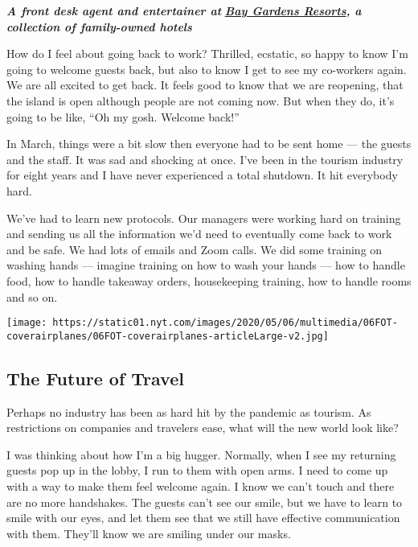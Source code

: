 \emph{\textbf{A front desk agent and entertainer at}}
\textbf{\href{https://www.baygardensresorts.com/}{\emph{Bay Gardens
Resorts}}\emph{, a collection of family-owned hotels}}

How do I feel about going back to work? Thrilled, ecstatic, so happy to
know I'm going to welcome guests back, but also to know I get to see my
co-workers again. We are all excited to get back. It feels good to know
that we are reopening, that the island is open although people are not
coming now. But when they do, it's going to be like, ``Oh my gosh.
Welcome back!''

In March, things were a bit slow then everyone had to be sent home ---
the guests and the staff. It was sad and shocking at once. I've been in
the tourism industry for eight years and I have never experienced a
total shutdown. It hit everybody hard.

We've had to learn new protocols. Our managers were working hard on
training and sending us all the information we'd need to eventually come
back to work and be safe. We had lots of emails and Zoom calls. We did
some training on washing hands --- imagine training on how to wash your
hands --- how to handle food, how to handle takeaway orders,
housekeeping training, how to handle rooms and so on.

\href{https://www.nytimes.com/interactive/2020/05/06/travel/coronavirus-travel-questions.html}{}

\texttt{[image: https://static01.nyt.com/images/2020/05/06/multimedia/06FOT-coverairplanes/06FOT-coverairplanes-articleLarge-v2.jpg]}

\hypertarget{the-future-of-travel}{%
\subsection{The Future of Travel}\label{the-future-of-travel}}

Perhaps no industry has been as hard hit by the pandemic as tourism. As
restrictions on companies and travelers ease, what will the new world
look like?

I was thinking about how I'm a big hugger. Normally, when I see my
returning guests pop up in the lobby, I run to them with open arms. I
need to come up with a way to make them feel welcome again. I know we
can't touch and there are no more handshakes. The guests can't see our
smile, but we have to learn to smile with our eyes, and let them see
that we still have effective communication with them. They'll know we
are smiling under our masks.


